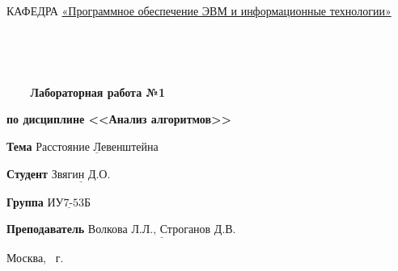 \begin{titlepage}
\noindent КАФЕДРА \underline{«Программное обеспечение ЭВМ и информационные технологии»}

\

\

\begin{center}
\noindent\begin{minipage}{1.0\textwidth}\centering
\Large\textbf{   ~~~ Лабораторная работа №1}

\textbf{по дисциплине <<Анализ алгоритмов>>}

\end{minipage}
\end{center}
\noindent\textbf{Тема} $\underline{\text{Расстояние Левенштейна}}$

\noindent\textbf{Студент} $\underline{\text{Звягин Д.О.}}$

\noindent\textbf{Группа} $\underline{\text{ИУ7-53Б}}$

\noindent\textbf{Преподаватель} $\underline{\text{Волкова Л.Л., Строганов Д.В.}}$

\begin{center}
\mbox{}
\vfill
Москва, \the\year ~г.
\end{center}
\clearpage
\end{titlepage}